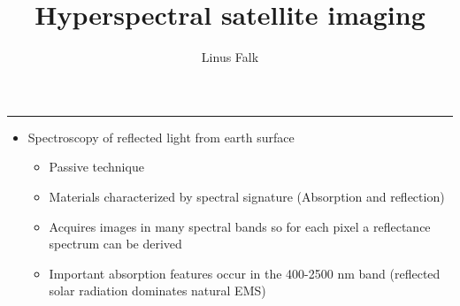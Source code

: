 \documentclass[12pt,preprintnumbers,amsmath,amssymb,nofootinbib,superscriptaddress]{revtex4-1}
\begin{document}


\vspace{10cm}

\title{Hyperspectral satellite imaging}


\author{Linus Falk}


\maketitle

\newpage


\newpage
{}
\vspace{-0.2cm}
\hrule
\vspace{0.8cm}
\begin{minipage}{0.6\textwidth}


  \begin{itemize}
    \item Spectroscopy of reflected light from earth surface
    \begin{itemize}
      \item Passive technique
      \item Materials characterized by spectral signature (Absorption and reflection)
      \item Acquires images in many spectral bands so for each pixel a reflectance spectrum can be derived
      \item Important absorption features occur in the 400-2500 nm band (reflected solar radiation dominates natural EMS)
    \end{itemize}
  \end{itemize}

\end{minipage}
\vspace{\fill}

\end{document}

